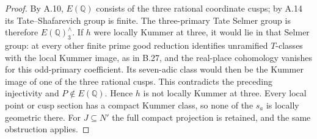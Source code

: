 \begin{proof}
By A.10, $E(\mathbb Q)$ consists of the three rational
coordinate cusps; by A.14 its Tate--Shafarevich group
is finite.  The three-primary Tate Selmer group is
therefore $E(\mathbb Q)^{\wedge}_3$.
If $h$ were locally Kummer at three, it would lie in
that Selmer group: at every other finite prime good
reduction identifies unramified $T$-classes with the
local Kummer image, as in B.27, and the real-place
cohomology vanishes for this odd-primary coefficient.
Its seven-adic class would then be the Kummer image of
one of the three rational cusps.  This contradicts
the preceding injectivity and $P\notin E(\mathbb Q)$.
Hence $h$ is not locally Kummer at three.
Every local point or cusp section has a compact Kummer
class, so none of the $s_a$ is locally geometric there.
For $J\subseteq N'$ the full compact projection is
retained, and the same obstruction applies.
\end{proof}

